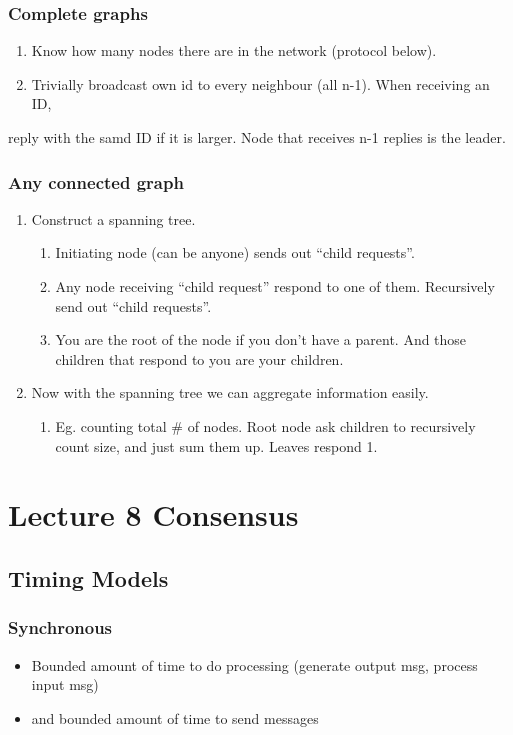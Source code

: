 \documentclass[11pt]{article}
\begin{document}
\subsubsection{Complete graphs}
\label{sec:orgf1ae983}
\begin{enumerate}
\item Know how many nodes there are in the network (protocol below).
\item Trivially broadcast own id to every neighbour (all n-1). When receiving an ID,
\end{enumerate}
reply with the samd ID if it is larger. Node that receives n-1 replies is the leader.
\subsubsection{Any connected graph}
\label{sec:org41323bd}
\begin{enumerate}
\item Construct a spanning tree.
\begin{enumerate}
\item Initiating node (can be anyone) sends out ``child requests''.
\item Any node receiving ``child request'' respond to one of them. Recursively
send out ``child requests''.
\item You are the root of the node if you don't have a parent. And those
children that respond to you are your children.
\end{enumerate}
\item Now with the spanning tree we can aggregate information easily.
\begin{enumerate}
\item Eg. counting total \# of nodes. Root node ask children to recursively count
size, and just sum them up. Leaves respond 1.
\end{enumerate}
\end{enumerate}
\section{Lecture 8 Consensus}
\label{sec:org6239d7d}
\subsection{Timing Models}
\label{sec:orgbaee82e}
\subsubsection{Synchronous}
\label{sec:org4e76bb1}
\begin{itemize}
\item Bounded amount of time to do processing (generate output msg, process input
msg)
\item and bounded amount of time to send messages
\end{itemize}
\end{document}
